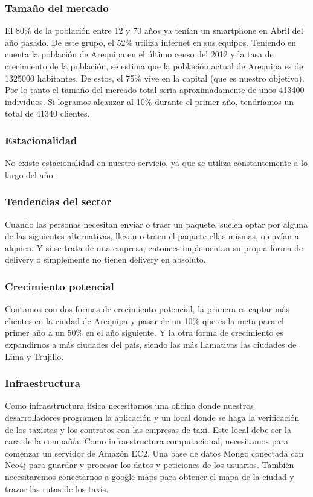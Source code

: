 \subsubsection{Tamaño del mercado}
El 80\% de la población entre 12 y 70 años ya tenían un smartphone en Abril del año pasado. De este grupo, el 52\% utiliza internet en sus equipos. Teniendo en cuenta la población de Arequipa en el último censo del 2012 y la tasa de crecimiento de la población, se estima que la población actual de Arequipa es de 1325000 habitantes. De estos, el 75\% vive en la capital (que es nuestro objetivo). Por lo tanto el tamaño del mercado total sería aproximadamente de unos 413400 individuos. Si logramos alcanzar al 10\% durante el primer año, tendríamos un total de 41340 clientes.

\subsubsection{Estacionalidad}
No existe estacionalidad en nuestro servicio, ya que se utiliza constantemente a lo largo del año.

\subsubsection{Tendencias del sector}
Cuando las personas necesitan enviar o traer un paquete, suelen optar por alguna de las siguientes alternativas, llevan o traen el paquete ellas mismas, o envían a alquien. Y si se trata de una empresa, entonces implementan su propia forma de delivery o simplemente no tienen delivery en absoluto.


\subsubsection{Crecimiento potencial}
Contamos con dos formas de crecimiento potencial, la primera es captar más clientes en la ciudad de Arequipa y pasar de un 10\% que es la meta para el primer año a un 50\% en el año siguiente. Y la otra forma de crecimiento es expandirnos a más ciudades del país, siendo las más llamativas las ciudades de Lima y Trujillo.

\subsubsection{Infraestructura}
Como infraestructura física necesitamos una oficina donde nuestros desarrolladores programen la aplicación y un local donde se haga la verificación de los taxistas y los contratos con las empresas de taxi. Este local debe ser la cara de la compañía.
Como infraestructura computacional, necesitamos para comenzar un servidor de Amazón EC2. Una base de datos Mongo conectada con Neo4j para guardar y procesar los datos y peticiones de los usuarios. También necesitaremos conectarnos a google maps para obtener el mapa de la ciudad y trazar las rutas de los taxis.

